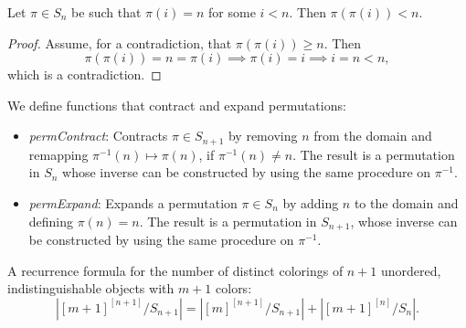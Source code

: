 \begin{proposition}
  \label{prop:perm-perm-val-lt-of-perm-val-eq}
  \leanok
  Let $\pi \in S_n$ be such that $\pi(i) = n$ for some $i < n$. Then $\pi(\pi(i)) < n$.
\end{proposition}

\begin{proof}
  \leanok
  Assume, for a contradiction, that $\pi(\pi(i)) \geq n$. Then
  \begin{equation*}
    \pi(\pi(i)) = n = \pi(i) \implies \pi(i) = i \implies i = n < n,
  \end{equation*}
  which is a contradiction.
\end{proof}

\begin{definition}
  \label{def:perm-contract-expand}
  \leanok
  We define functions that contract and expand permutations:
  \begin{itemize}
    \item \emph{permContract}: Contracts $\pi \in S_{n + 1}$ by removing $n$ from the domain and remapping $\pi^{-1}(n) \mapsto \pi(n)$, if $\pi^{-1}(n) \neq n$. The result is a permutation in $S_n$ whose inverse can be constructed by using the same procedure on $\pi^{-1}$.

    \item \emph{permExpand}: Expands a permutation $\pi \in S_n$ by adding $n$ to the domain and defining $\pi(n) = n$. The result is a permutation in $S_{n + 1}$, whose inverse can be constructed by using the same procedure on $\pi^{-1}$.
  \end{itemize}
\end{definition}

\begin{proposition}
  \label{prop:numDistinctColoringsOfPerm-succ-succ}
  \leanok
  A recurrence formula for the number of distinct colorings of $n + 1$ unordered, indistinguishable objects with $m + 1$ colors:
  \begin{equation*}
    |[m + 1]^{[n + 1]}/S_{n + 1}| = |[m]^{[n + 1]}/S_{n + 1}| + |[m + 1]^{[n]}/S_n|.
  \end{equation*}
\end{proposition}

